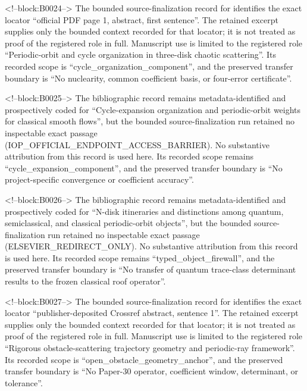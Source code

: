 \documentclass[11pt,a4paper]{article}
\begin{document}
<!--block:B0024-->
The bounded source-finalization record for \citep{P30-S04} identifies
the exact locator ``official PDF page 1, abstract, first sentence''.  The retained excerpt supplies only the
bounded context recorded for that locator; it is not treated as proof of the
registered role in full.  Manuscript use is limited to the registered role ``Periodic-orbit and cycle organization in three-disk chaotic scattering''.
Its recorded scope is ``cycle\_organization\_component'', and the preserved
transfer boundary is ``No nuclearity, common coefficient basis, or four-error certificate''.

<!--block:B0025-->
\begingroup
\sloppy
The bibliographic record \citep{P30-S05} remains metadata-identified and
prospectively coded for ``Cycle-expansion organization and periodic-orbit weights for classical smooth flows'', but the bounded source-finalization
run retained no inspectable exact passage (IOP\_\allowbreak OFFICIAL\_\allowbreak ENDPOINT\_\allowbreak ACCESS\_\allowbreak BARRIER).  No substantive
attribution from this record is used here.  Its recorded scope remains
``cycle\_expansion\_component'', and the preserved transfer boundary is ``No project-specific convergence or coefficient accuracy''.
\par
\endgroup

<!--block:B0026-->
The bibliographic record \citep{P30-S06} remains metadata-identified and
prospectively coded for ``N-disk itineraries and distinctions among quantum, semiclassical, and classical periodic-orbit objects'', but the bounded source-finalization
run retained no inspectable exact passage (ELSEVIER\_REDIRECT\_ONLY).  No substantive
attribution from this record is used here.  Its recorded scope remains
``typed\_object\_firewall'', and the preserved transfer boundary is ``No transfer of quantum trace-class determinant results to the frozen classical roof operator''.

<!--block:B0027-->
The bounded source-finalization record for \citep{P30-S09} identifies
the exact locator ``publisher-deposited Crossref abstract, sentence 1''.  The retained excerpt supplies only the
bounded context recorded for that locator; it is not treated as proof of the
registered role in full.  Manuscript use is limited to the registered role ``Rigorous obstacle-scattering trajectory geometry and periodic-ray framework''.
Its recorded scope is ``open\_obstacle\_geometry\_anchor'', and the preserved
transfer boundary is ``No Paper-30 operator, coefficient window, determinant, or tolerance''.
\end{document}
